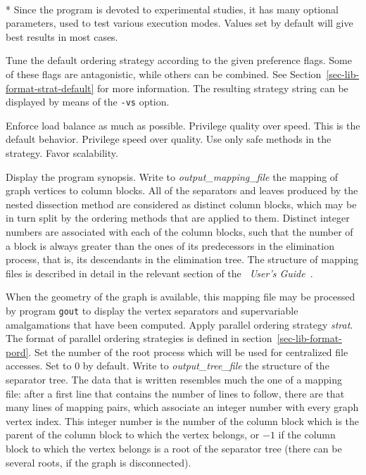 \begin{itemize}
\progopt\\*
Since the program is devoted to experimental studies, it has many
optional parameters, used to test various execution modes. Values
set by default will give best results in most cases.
\begin{itemize}
\iteme[{\tt -c}{\it flags}]
Tune the default ordering strategy according to the given preference
flags. Some of these flags are antagonistic, while others can be
combined. See Section~\ref{sec-lib-format-strat-default} for more
information. The resulting strategy string can be displayed by means
of the {\tt -vs} option.
\begin{itemize}
\iteme[{\tt b}]
Enforce load balance as much as possible.
\iteme[{\tt q}]
Privilege quality over speed. This is the default behavior.
\iteme[{\tt s}]
Privilege speed over quality.
\iteme[{\tt t}]
Use only safe methods in the strategy.
\iteme[{\tt x}]
Favor scalability.
\end{itemize}
\iteme[{\tt -h}]
Display the program synopsis.
Write to {\it output\_mapping\_file\/} the mapping of graph vertices to
column blocks. All of the separators and leaves produced by the nested
dissection method are considered as distinct column blocks, which may
be in turn split by the ordering methods that are applied to them.
Distinct integer numbers are associated with each of the column blocks,
such that the number of a block is always greater than the ones of its
predecessors in the elimination process, that is, its descendants in
the elimination tree.
The structure of mapping files is described in detail in the relevant
section of the {\it\scotch\ User's Guide}~\scotchcitesuser.

When the geometry of the graph is available, this mapping file may be
processed by program {\tt gout} to display the vertex separators and
supervariable amalgamations that have been computed.
\iteme[{{\tt -o}{\it strat}}]
Apply parallel ordering strategy {\it strat}. The format of parallel
ordering strategies is defined in section~\ref{sec-lib-format-pord}.
\iteme[{\tt -r}{\it num}]
Set the number of the root process which will be used for centralized
file accesses. Set to $0$ by default.
Write to {\it output\_tree\_file\/} the structure of the separator
tree. The data that is written resembles much the one of a mapping
file: after a first line that contains the number of lines to follow,
there are that many lines of mapping pairs, which associate an integer
number with every graph vertex index. This integer number is the
number of the column block which is the parent of the column block to
which the vertex belongs, or $-1$ if the column block to which the
vertex belongs is a root of the separator tree (there can be several
roots, if the graph is disconnected).


\end{itemize}
\end{itemize}
